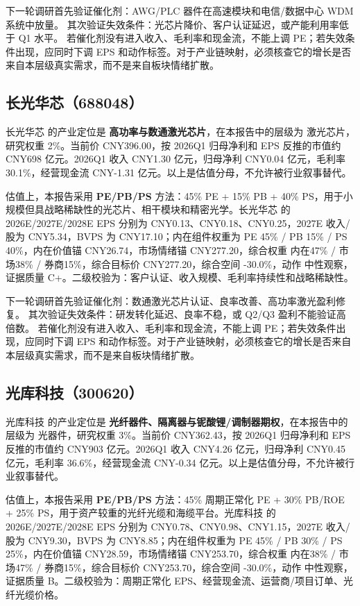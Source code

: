 下一轮调研首先验证催化剂：AWG/PLC 器件在高速模块和电信/数据中心 WDM 系统中放量。 其次验证失效条件：光芯片降价、客户认证延迟，或产能利用率低于 Q1 水平。 若催化剂没有进入收入、毛利率和现金流，不能上调 PE；若失效条件出现，应同时下调 EPS 和动作标签。对于产业链映射，必须核查它的增长是否来自本层级真实需求，而不是来自板块情绪扩散。


\subsection{长光华芯（688048）}
长光华芯 的产业定位是 \textbf{高功率与数通激光芯片}，在本报告中的层级为 激光芯片，研究权重 2\%。当前价 CNY396.00，按 2026Q1 归母净利和 EPS 反推的市值约 CNY698 亿元。2026Q1 收入 CNY1.30 亿元，归母净利 CNY0.04 亿元，毛利率 30.1\%，经营现金流 CNY-1.31 亿元。以上是估值分母，不允许被行业叙事替代。

估值上，本报告采用 \textbf{PE/PB/PS} 方法：45\% PE + 15\% PB + 40\% PS，用于小规模但具战略稀缺性的光芯片、相干模块和精密光学。长光华芯 的 2026E/2027E/2028E EPS 分别为 CNY0.13、CNY0.18、CNY0.25，2027E 收入/股为 CNY5.34，BVPS 为 CNY17.10；内在组件权重为 PE 45\% / PB 15\% / PS 40\%，内在价值锚 CNY26.74，市场情绪锚 CNY277.20，综合权重 内在47\% / 市场38\% / 券商15\%，综合目标价 CNY277.20，综合空间 -30.0\%，动作 中性观察，证据质量 C+。二级校验为：客户认证、收入规模、毛利率持续性和战略稀缺性。

下一轮调研首先验证催化剂：数通激光芯片认证、良率改善、高功率激光盈利修复。 其次验证失效条件：研发转化延迟、良率不稳，或 Q2/Q3 盈利不能验证高倍数。 若催化剂没有进入收入、毛利率和现金流，不能上调 PE；若失效条件出现，应同时下调 EPS 和动作标签。对于产业链映射，必须核查它的增长是否来自本层级真实需求，而不是来自板块情绪扩散。


\subsection{光库科技（300620）}
光库科技 的产业定位是 \textbf{光纤器件、隔离器与铌酸锂/调制器期权}，在本报告中的层级为 光器件，研究权重 3\%。当前价 CNY362.43，按 2026Q1 归母净利和 EPS 反推的市值约 CNY903 亿元。2026Q1 收入 CNY4.26 亿元，归母净利 CNY0.45 亿元，毛利率 36.6\%，经营现金流 CNY-0.34 亿元。以上是估值分母，不允许被行业叙事替代。

估值上，本报告采用 \textbf{PE/PB/PS} 方法：45\% 周期正常化 PE + 30\% PB/ROE + 25\% PS，用于资产较重的光纤光缆和海缆平台。光库科技 的 2026E/2027E/2028E EPS 分别为 CNY0.78、CNY0.98、CNY1.15，2027E 收入/股为 CNY9.30，BVPS 为 CNY8.85；内在组件权重为 PE 45\% / PB 30\% / PS 25\%，内在价值锚 CNY28.59，市场情绪锚 CNY253.70，综合权重 内在38\% / 市场47\% / 券商15\%，综合目标价 CNY253.70，综合空间 -30.0\%，动作 中性观察，证据质量 B。二级校验为：周期正常化 EPS、经营现金流、运营商/项目订单、光纤光缆价格。

